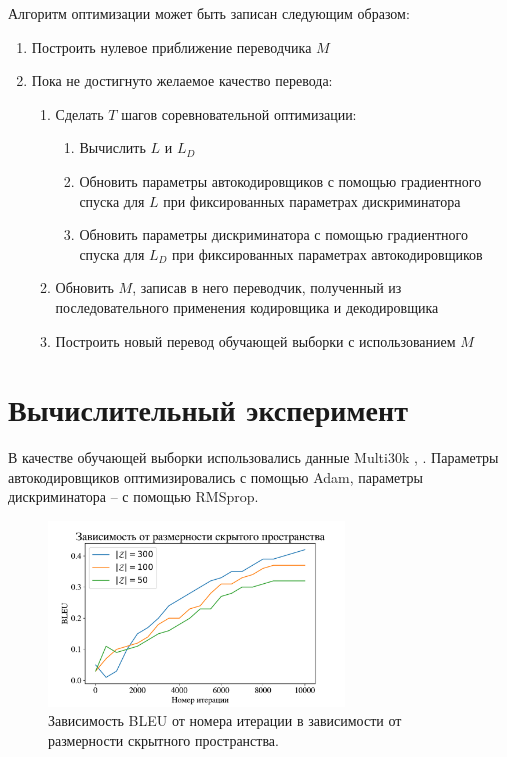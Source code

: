 \documentclass[12pt,twoside]{article}
\begin{document}
Алгоритм оптимизации может быть записан следующим образом:
\begin{enumerate}
	\item Построить нулевое приближение переводчика $M$
	\item Пока не достигнуто желаемое качество перевода:
	\begin{enumerate}
	\item Сделать $T$ шагов соревновательной оптимизации:
	\begin{enumerate}
		\item Вычислить $L$ и $L_D$
		\item Обновить параметры автокодировщиков с помощью градиентного спуска для $L$ при фиксированных параметрах дискриминатора
		\item Обновить параметры дискриминатора с помощью градиентного спуска для $L_D$ при фиксированных параметрах автокодировщиков
	\end{enumerate}
	\item Обновить $M$, записав в него переводчик, полученный из последовательного применения кодировщика и декодировщика
	\item Построить новый перевод обучающей выборки с использованием $M$
	\end{enumerate}
\end{enumerate}

\section{Вычислительный эксперимент}

В качестве обучающей выборки использовались данные Multi30k \cite{elliott-EtAl:2017:WMT}, \cite{W16-3210}. Параметры автокодировщиков оптимизировались с помощью Adam, параметры дискриминатора -- с помощью RMSprop.

\begin{figure}[h]
	\centering
	\includegraphics[width=0.7\textwidth]{hidden}
	\caption{Зависимость BLEU от номера итерации в зависимости от размерности скрытного пространства.}
\end{figure}
\end{document}
